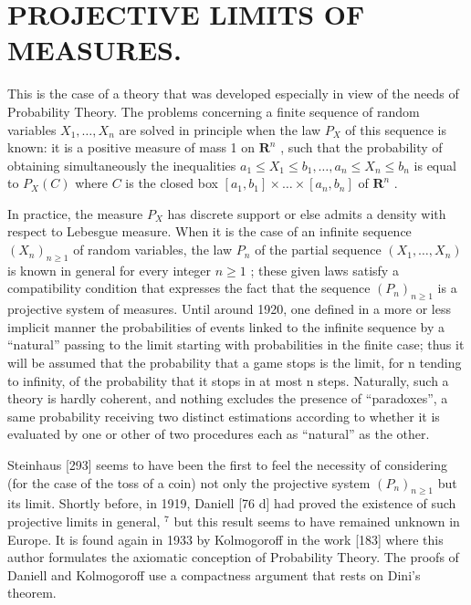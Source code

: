 \section*{PROJECTIVE LIMITS OF MEASURES.}
{}

This is the case of a theory that was developed especially in view of the needs of Probability Theory. The problems concerning a finite sequence of random variables \(X_{1}, \ldots, X_{n}\) are solved in principle when the law \(P_{X}\) of this sequence is known: it is a positive measure of mass 1 on \(\mathbf{R}^{n}\) , such that the probability of obtaining simultaneously the inequalities \(a_{1} \leq X_{1} \leq b_{1}, \ldots, a_{n} \leq X_{n} \leq b_{n}\) is equal to \(P_{X}(C)\) where \(C\) is the closed box \([a_{1}, b_{1}] \times \ldots \times [a_{n}, b_{n}]\) of \(\mathbf{R}^{n}\) .

In practice, the measure \(P_{X}\) has discrete support or else admits a density with respect to Lebesgue measure. When it is the case of an infinite sequence \((X_{n})_{n\geq1}\) of random variables, the law \(P_{n}\) of the partial sequence \((X_{1},\ldots,X_{n})\) is known in general for every integer \(n\geq1\) ; these given laws satisfy a compatibility condition that expresses the fact that the sequence \((P_{n})_{n\geq1}\) is a projective system of measures. Until around 1920, one defined in a more or less implicit manner the probabilities of events linked to the infinite sequence by a ``natural'' passing to the limit starting with probabilities in the finite case; thus it will be assumed that the probability that a game stops is the limit, for n tending to infinity, of the probability that it stops in at most n steps. Naturally, such a theory is hardly coherent, and nothing excludes the presence of ``paradoxes'', a same probability receiving two distinct estimations according to whether it is evaluated by one or other of two procedures each as ``natural'' as the other.

Steinhaus {[}293{]} seems to have been the first to feel the necessity of considering (for the case of the toss of a coin) not only the projective system \((P_{n})_{n\geq1}\) but its limit. Shortly before, in 1919, Daniell {[}76 d{]} had proved the existence of such projective limits in general, \(^{7}\) but this result seems to have remained unknown in Europe. It is found again in 1933 by Kolmogoroff in the work {[}183{]} where this author formulates the axiomatic conception of Probability Theory. The proofs of Daniell and Kolmogoroff use a compactness argument that rests on Dini's theorem.

